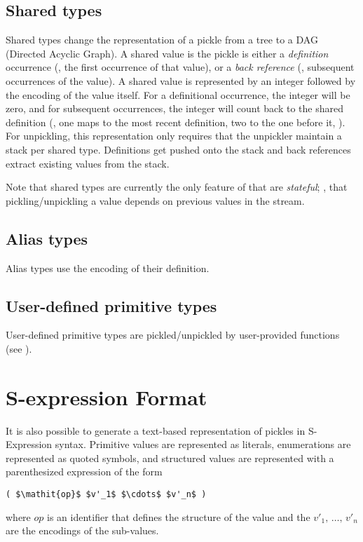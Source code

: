\subsection{Shared types}
\label{sec:shared-pickle-rep}

Shared types change the representation of a pickle from a tree to a DAG
(Directed Acyclic Graph).  A shared value is the pickle is
either a \emph{definition} occurrence (\ie{}, the first occurrence of that
value), or a \emph{back reference} (\ie{}, subsequent occurrences of the value).
A shared value is represented by an integer followed by the encoding of the
value itself.  For a definitional occurrence, the integer will be zero, and
for subsequent occurrences, the integer will count back to the shared definition
(\eg{}, one maps to the most recent definition, two to the one before it, \etc{}).
For unpickling, this representation only requires that the unpickler maintain
a stack per shared type.  Definitions get pushed onto the stack and back references
extract existing values from the stack.

Note that shared types are currently the only feature of \asdl{} that are
\emph{stateful}; \ie{}, that pickling/unpickling a value depends on previous
values in the stream.

\subsection{Alias types}
Alias types use the encoding of their definition.

\subsection{User-defined primitive types}
User-defined primitive types are pickled/unpickled by user-provided functions (see
).

\section{S-expression Format}
\label{sec:s-expressions}
It is also possible to generate a text-based representation of pickles in S-Expression
syntax.
Primitive values are represented as literals, enumerations are represented
as quoted symbols, and structured values are represented with a parenthesized
expression of the form
\begin{code}\begin{lstlisting}[mathescape=true]
( $\mathit{op}$ $v'_1$ $\cdots$ $v'_n$ )
\end{lstlisting}\end{code}%
where $\mathit{op}$ is an identifier that defines the structure of the value
and the $v'_1,\,\ldots,\,v'_n$ are the encodings of the sub-values.

